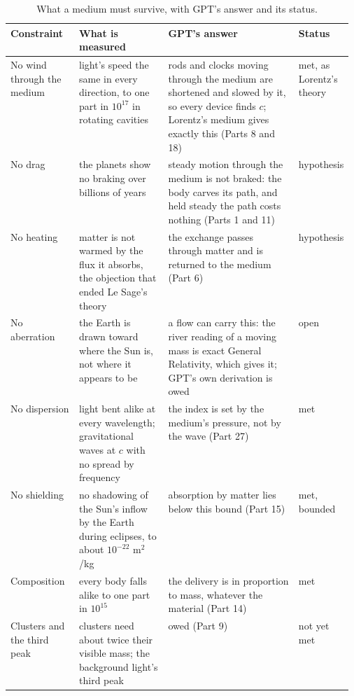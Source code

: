 \begin{table}[t]\centering\footnotesize
\caption{What a medium must survive, with GPT's answer and its status.}
\renewcommand{\arraystretch}{1.08}\begin{tabularx}{\linewidth}{@{}>{\raggedright\arraybackslash}p{0.2\linewidth} >{\raggedright\arraybackslash}p{0.26\linewidth} >{\raggedright\arraybackslash}X >{\raggedright\arraybackslash}p{0.11\linewidth}@{}}\toprule
\textbf{Constraint} & \textbf{What is measured} & \textbf{GPT's answer} & \textbf{Status}\\\midrule
No wind through the medium & light's speed the same in every direction, to one part in $10^{17}$ in rotating cavities & rods and clocks moving through the medium are shortened and slowed by it, so every device finds $c$; Lorentz's medium gives exactly this (Parts 8 and 18) & met, as Lorentz's theory\\
No drag & the planets show no braking over billions of years & steady motion through the medium is not braked: the body carves its path, and held steady the path costs nothing (Parts 1 and 11) & hypothesis\\
No heating & matter is not warmed by the flux it absorbs, the objection that ended Le Sage's theory & the exchange passes through matter and is returned to the medium (Part 6) & hypothesis\\
No aberration & the Earth is drawn toward where the Sun is, not where it appears to be & a flow can carry this: the river reading of a moving mass is exact General Relativity, which gives it; GPT's own derivation is owed & open\\
No dispersion & light bent alike at every wavelength; gravitational waves at $c$ with no spread by frequency & the index is set by the medium's pressure, not by the wave (Part 27) & met\\
No shielding & no shadowing of the Sun's inflow by the Earth during eclipses, to about $10^{-22}$ m$^2$/kg & absorption by matter lies below this bound (Part 15) & met, bounded\\
Composition & every body falls alike to one part in $10^{15}$ & the delivery is in proportion to mass, whatever the material (Part 14) & met\\
Clusters and the third peak & clusters need about twice their visible mass; the background light's third peak & owed (Part 9) & not yet met\\\bottomrule
\end{tabularx}\label{tab:survive}\end{table}

